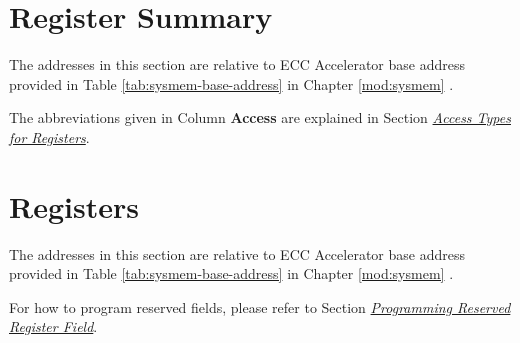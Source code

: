 \documentclass[main\_\_EN.tex]{subfiles}
\begin{document}



\newpage
\hypertarget{ecc-reg-summ}{}
\section{Register Summary}
\label{sec:ecc-reg-summ}

The addresses in this section are relative to ECC Accelerator base address provided in Table \ref{tab:sysmem-base-address} in Chapter \ref{mod:sysmem} \textit{}.

The abbreviations given in Column \textbf{Access} are explained in Section \hyperref[glossary-access-types]{\textit{Access Types for Registers}}.






\newpage
\section{Registers}

The addresses in this section are relative to ECC Accelerator base address provided in Table \ref{tab:sysmem-base-address} in Chapter \ref{mod:sysmem} \textit{}.

For how to program reserved fields, please refer to Section \hyperref[programming-reserved-field]{\textit{Programming Reserved Register Field}}.


\end{document}
